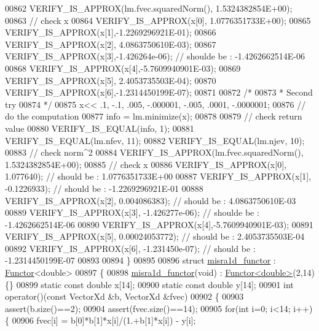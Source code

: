 \begin{DoxyCode}
00862   VERIFY\_IS\_APPROX(lm.fvec.squaredNorm(), 1.5324382854E+00);
00863   \textcolor{comment}{// check x}
00864   VERIFY\_IS\_APPROX(x[0], 1.0776351733E+00);
00865   VERIFY\_IS\_APPROX(x[1],-1.2269296921E-01);
00866   VERIFY\_IS\_APPROX(x[2], 4.0863750610E-03);
00867   VERIFY\_IS\_APPROX(x[3],-1.426264e-06); \textcolor{comment}{// shoulde be : -1.4262662514E-06}
00868   VERIFY\_IS\_APPROX(x[4],-5.7609940901E-03);
00869   VERIFY\_IS\_APPROX(x[5], 2.4053735503E-04);
00870   VERIFY\_IS\_APPROX(x[6],-1.2314450199E-07);
00871 
00872   \textcolor{comment}{/*}
00873 \textcolor{comment}{   * Second try}
00874 \textcolor{comment}{   */}
00875   x<< .1, -.1, .005, -.000001, -.005, .0001, -.0000001;
00876   \textcolor{comment}{// do the computation}
00877   info = lm.minimize(x);
00878 
00879   \textcolor{comment}{// check return value}
00880   VERIFY\_IS\_EQUAL(info, 1);
00881   VERIFY\_IS\_EQUAL(lm.nfev, 11);
00882   VERIFY\_IS\_EQUAL(lm.njev, 10);
00883   \textcolor{comment}{// check norm^2}
00884   VERIFY\_IS\_APPROX(lm.fvec.squaredNorm(), 1.5324382854E+00);
00885   \textcolor{comment}{// check x}
00886   VERIFY\_IS\_APPROX(x[0], 1.077640); \textcolor{comment}{// should be :  1.0776351733E+00}
00887   VERIFY\_IS\_APPROX(x[1], -0.1226933); \textcolor{comment}{// should be : -1.2269296921E-01}
00888   VERIFY\_IS\_APPROX(x[2], 0.004086383); \textcolor{comment}{// should be : 4.0863750610E-03}
00889   VERIFY\_IS\_APPROX(x[3], -1.426277e-06); \textcolor{comment}{// shoulde be : -1.4262662514E-06}
00890   VERIFY\_IS\_APPROX(x[4],-5.7609940901E-03);
00891   VERIFY\_IS\_APPROX(x[5], 0.00024053772); \textcolor{comment}{// should be : 2.4053735503E-04}
00892   VERIFY\_IS\_APPROX(x[6], -1.231450e-07); \textcolor{comment}{// should be : -1.2314450199E-07}
00893 
00894 \}
00895 
00896 \textcolor{keyword}{struct }\hyperlink{structmisra1d__functor}{misra1d\_functor} : \hyperlink{struct_functor}{Functor}<double>
00897 \{
00898     \hyperlink{structmisra1d__functor}{misra1d\_functor}(\textcolor{keywordtype}{void}) : \hyperlink{struct_functor}{Functor<double>}(2,14) \{\}
00899     \textcolor{keyword}{static} \textcolor{keyword}{const} \textcolor{keywordtype}{double} x[14];
00900     \textcolor{keyword}{static} \textcolor{keyword}{const} \textcolor{keywordtype}{double} y[14];
00901     \textcolor{keywordtype}{int} operator()(\textcolor{keyword}{const} VectorXd &b, VectorXd &fvec)
00902     \{
00903         assert(b.size()==2);
00904         assert(fvec.size()==14);
00905         \textcolor{keywordflow}{for}(\textcolor{keywordtype}{int} i=0; i<14; i++) \{
00906             fvec[i] = b[0]*b[1]*x[i]/(1.+b[1]*x[i]) - y[i];

\end{DoxyCode}
